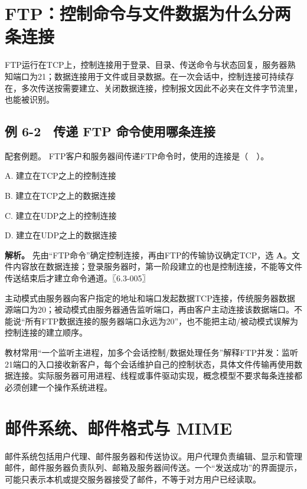 \section{FTP：控制命令与文件数据为什么分两条连接}\label{CN06-04}

FTP运行在TCP上，控制连接用于登录、目录、传送命令与状态回复，服务器熟知端口为21；数据连接用于文件或目录数据。在一次会话中，控制连接可持续存在，多次传送按需要建立、关闭数据连接，控制报文因此不必夹在文件字节流里，也能被识别。

\subsection{例 6-2　传递 FTP 命令使用哪条连接}\label{CN06-ex2}

\begin{example}[配套例题]

配套例题。 FTP客户和服务器间传递FTP命令时，使用的连接是（　）。

A. 建立在TCP之上的控制连接

B. 建立在TCP之上的数据连接

C. 建立在UDP之上的控制连接

D. 建立在UDP之上的数据连接

\end{example}

\textbf{解析。} 先由``FTP命令''确定控制连接，再由FTP的传输协议确定TCP，选 \textbf{A}。文件内容放在数据连接；登录服务器时，第一阶段建立的也是控制连接，不能等文件传送结束后才建立命令通道。〖6.3-005〗

主动模式由服务器向客户指定的地址和端口发起数据TCP连接，传统服务器数据源端口为20；被动模式由服务器通告监听端口，再由客户主动连接该数据端口。不能说``所有FTP数据连接的服务器端口永远为20''，也不能把主动/被动模式误解为控制连接的建立顺序。

教材常用``一个监听主进程，加多个会话控制/数据处理任务''解释FTP并发：监听21端口的入口接收新客户，每个会话维护自己的控制状态，具体文件传输再使用数据连接。实际服务器可用进程、线程或事件驱动实现，概念模型不要求每条连接都必须创建一个操作系统进程。

\section{邮件系统、邮件格式与 MIME}\label{CN06-05}

邮件系统包括用户代理、邮件服务器和传送协议。用户代理负责编辑、显示和管理邮件，邮件服务器负责队列、邮箱及服务器间传送。一个``发送成功''的界面提示，可能只表示本机或提交服务器接受了邮件，不等于对方用户已经读取。

